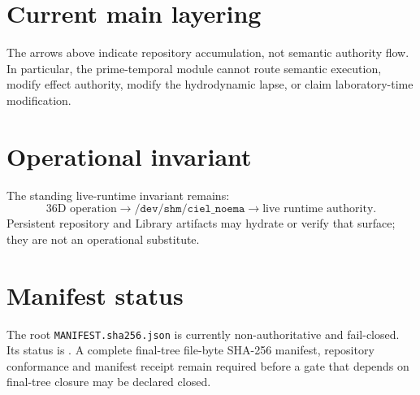 \section{Current main layering}
\begin{center}
\end{center}

The arrows above indicate repository accumulation, not semantic authority flow. In particular, the prime-temporal module cannot route semantic execution, modify effect authority, modify the hydrodynamic lapse, or claim laboratory-time modification.

\section{Operational invariant}
The standing live-runtime invariant remains:
\[
\boxed{\text{36D operation}\longrightarrow /\texttt{dev/shm/ciel\_noema}\longrightarrow\text{live runtime authority}.}
\]
Persistent repository and Library artifacts may hydrate or verify that surface; they are not an operational substitute.

\section{Manifest status}
The root \texttt{MANIFEST.sha256.json} is currently non-authoritative and fail-closed. Its status is . A complete final-tree file-byte SHA-256 manifest, repository conformance and manifest receipt remain required before a gate that depends on final-tree closure may be declared closed.
